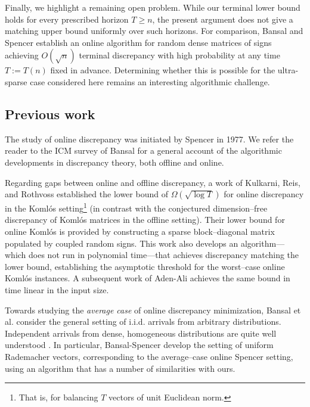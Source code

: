 \documentclass[reqno,english]{amsart}
\theoremstyle{definition}
\begin{document}
Finally, we highlight a remaining open problem. While our terminal lower bound holds for every prescribed horizon $T\ge n$, the present argument does not give a matching upper bound uniformly over such horizons. 
For comparison, Bansal and Spencer \cite{bansal-spencer} establish an online
algorithm for random dense matrices of signs achieving $O(\sqrt n)$ terminal
discrepancy with high probability at any time $T := T(n)$ fixed in advance. Determining whether this is possible for the ultra-sparse case considered here remains an interesting algorithmic challenge. 



\subsection{Previous work}
The study of online discrepancy was initiated by Spencer \cite{spencer-online} in 1977. We refer the reader to the ICM survey of Bansal \cite{bansal-survey} for a general account of the algorithmic developments in discrepancy theory, both offline and online.

Regarding gaps between online and offline discrepancy, a work of Kulkarni, Reis, and Rothvoss \cite{optimal-online} established the lower bound of $\Omega(\sqrt{\log T})$ for online discrepancy in the Koml\'os setting\footnote{That is, for balancing $T$ vectors of unit Euclidean norm.} (in contrast with the conjectured dimension--free discrepancy of Koml\'os matrices in the offline setting). Their lower bound for online Koml\'os is provided by constructing a sparse block--diagonal matrix populated by coupled random signs. This work also develops an algorithm---which does not run in polynomial time---that achieves discrepancy matching the lower bound, establishing the asymptotic threshold for the worst--case online Koml\'os instances. A subsequent work of Aden-Ali \cite{aden-ali-online} achieves the same bound in time linear in the input size.

Towards studying the \textit{average case} of online discrepancy minimization, Bansal et al. \cite{bansal-online} consider the general setting of i.i.d. arrivals from arbitrary distributions. Independent arrivals from dense, homogeneous distributions are quite well understood \cite{bansal-spencer,ALS2,kim-roche}. In particular, Bansal-Spencer \cite{bansal-spencer} develop the setting of uniform Rademacher vectors, corresponding to the average--case online Spencer setting, using an algorithm that has a number of similarities with ours. 
\end{document}
